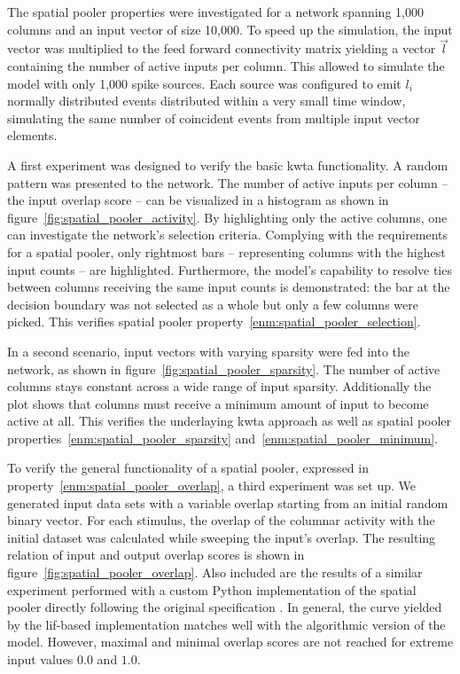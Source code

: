 The spatial pooler properties were investigated for a network spanning 1,000 columns and an input vector of size 10,000. To speed up the simulation, the input vector was multiplied to the feed forward connectivity matrix yielding a vector $\vec{l}$ containing the number of active inputs per column. This allowed to simulate the model with only 1,000 spike sources. Each source was configured to emit $l_i$ normally distributed events distributed within a very small time window, simulating the same number of coincident events from multiple input vector elements.

A first experiment was designed to verify the basic \gls{kwta} functionality. A random pattern was presented to the network. The number of active inputs per column -- the input overlap score -- can be visualized in a histogram as shown in figure~\ref{fig:spatial_pooler_activity}. By highlighting only the active columns, one can investigate the network's selection criteria. Complying with the requirements for a spatial pooler, only rightmost bars -- representing columns with the highest input counts -- are highlighted. Furthermore, the model's capability to resolve ties between columns receiving the same input counts is demonstrated: the bar at the decision boundary was not selected as a whole but only a few columns were picked. This verifies spatial pooler property~\ref{enm:spatial_pooler_selection}.

In a second scenario, input vectors with varying sparsity were fed into the network, as shown in figure~\ref{fig:spatial_pooler_sparsity}. The number of active columns stays constant across a wide range of input sparsity. Additionally the plot shows that columns must receive a minimum amount of input to become active at all. This verifies the underlaying \gls{kwta} approach as well as spatial pooler properties~\ref{enm:spatial_pooler_sparsity} and~\ref{enm:spatial_pooler_minimum}.

To verify the general functionality of a spatial pooler, expressed in property~\ref{enm:spatial_pooler_overlap}, a third experiment was set up. We generated input data sets with a variable overlap starting from an initial random binary vector. For each stimulus, the overlap of the columnar activity with the initial dataset was calculated while sweeping the input's overlap. The resulting relation of input and output overlap scores is shown in figure~\ref{fig:spatial_pooler_overlap}. Also included are the results of a similar experiment performed with a custom Python implementation of the spatial pooler directly following the original specification \citep{numenta2011htm}. In general, the curve yielded by the \gls{lif}-based implementation matches well with the algorithmic version of the model. However, maximal and minimal overlap scores are not reached for extreme input values $0.0$ and $1.0$.

